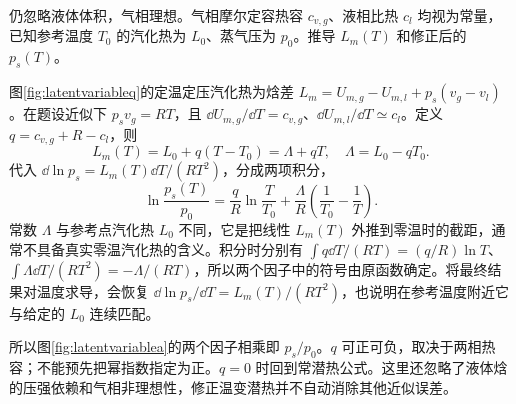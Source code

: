 \begin{example}[汽化热随温度变化的修正]\label{ex:variablelatent}
仍忽略液体体积，气相理想。气相摩尔定容热容 $c_{v,g}$、液相比热 $c_l$ 均视为常量，已知参考温度 $T_0$ 的汽化热为 $L_0$、蒸气压为 $p_0$。推导 $L_m(T)$ 和修正后的 $p_s(T)$。
\end{example}
\begin{solution}
图\ref{fig:latentvariableq}的定温定压汽化热为焓差 $L_m=U_{m,g}-U_{m,l}+p_s(v_g-v_l)$。在题设近似下 $p_sv_g=RT$，且 $\dd U_{m,g}/\dd T=c_{v,g}$、$\dd U_{m,l}/\dd T\simeq c_l$。定义 $q=c_{v,g}+R-c_l$，则
\[
 L_m(T)=L_0+q(T-T_0)=\Lambda+qT,\quad\Lambda=L_0-qT_0.
\]
代入 $\dd\ln p_s=L_m(T)\dd T/(RT^2)$，分成两项积分，
\[
 \ln\frac{p_s(T)}{p_0}=
 \frac qR\ln\frac T{T_0}+\frac\Lambda R\left(\frac1{T_0}-\frac1T\right).
\]
常数 $\Lambda$ 与参考点汽化热 $L_0$ 不同，它是把线性 $L_m(T)$ 外推到零温时的截距，通常不具备真实零温汽化热的含义。积分时分别有 $\int q\dd T/(RT)=(q/R)\ln T$、$\int\Lambda\dd T/(RT^2)=-\Lambda/(RT)$，所以两个因子中的符号由原函数确定。将最终结果对温度求导，会恢复 $\dd\ln p_s/\dd T=L_m(T)/(RT^2)$，也说明在参考温度附近它与给定的 $L_0$ 连续匹配。

所以图\ref{fig:latentvariablea}的两个因子相乘即 $p_s/p_0$。$q$ 可正可负，取决于两相热容；不能预先把幂指数指定为正。$q=0$ 时回到常潜热公式。这里还忽略了液体焓的压强依赖和气相非理想性，修正温变潜热并不自动消除其他近似误差。
\end{solution}

